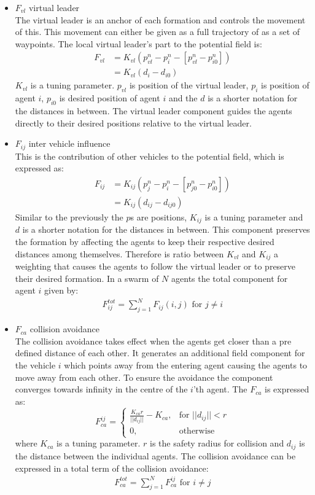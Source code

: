\begin{itemize}
\item $F_{vl}$ virtual leader\\
The virtual leader is an anchor of each formation and controls the movement of this. This movement can either be given as a full trajectory of as a set of waypoints. The local virtual leader's part to the potential field is:
\begin{align}
F_{vl} &= K_{vl}(p_{vl}^n-p_i^n-[p_{vl}^n-p_{i0}^n])\\
&= K_{vl}(d_i-d_{i0})
\end{align}
$K_{vl}$ is a tuning parameter. $p_{vl}$ is position of the virtual leader, $p_i$ is position of agent $i$, $p_{i0}$ is desired position of agent $i$ and the $d$ is a shorter notation for the distances in between. The virtual leader component guides the agents directly to their desired positions relative to the virtual leader.

\item $F_{ij}$ inter vehicle influence\\
This is the contribution of other vehicles to the potential field, which is expressed as:
\begin{align}
F_{ij} &= K_{ij}(p_{j}^n-p_i^n-[p_{j0}^n-p_{i0}^n])\\
&= K_{ij}(d_{ij}-d_{ij0})
\end{align}
Similar to the previously the $p$s are positions, $K_{ij}$ is a tuning parameter and $d$ is a shorter notation for the distances in between. This component preserves the formation by affecting the agents to keep their respective desired distances among themselves. Therefore is ratio between $K_{vl}$ and $K_{ij}$ a weighting that causes the agents to follow the virtual leader or to preserve their desired formation. In a swarm of $N$ agents the total component for agent $i$ given by:
\begin{align}
F_{ij}^{tot} = \sum\limits_{j=1}^NF_{ij}(i,j) \text{ for } j\neq i
\end{align}

\item $F_{ca}$ collision avoidance\\
The collision avoidance takes effect when the agents get closer than a pre defined distance of each other. It generates an additional field component for the vehicle $i$ which points away from the entering agent causing the agents to move away from each other. To ensure the avoidance the component converges towards infinity in the centre of the $i$'th agent. The $F_{ca}$ is expressed as:
\[
    F_{ca}^{ij}= 
\begin{cases}
    \frac{K_{ca}r}{||d_{ij}||}-K_{ca},& \text{for } ||d_{ij}||<r\\
    0,              & \text{otherwise}
\end{cases}
\]
where $K_{ca}$ is a tuning parameter. $r$ is the safety radius for collision and $d_{ij}$ is the distance between the individual agents.
The collision avoidance can be expressed in a total term of the collision avoidance:
\begin{align}
F_{ca}^{tot} = \sum\limits_{j=1}^NF_{ca}^{ij} \text{ for } i\neq j
\end{align}


\end{itemize}
